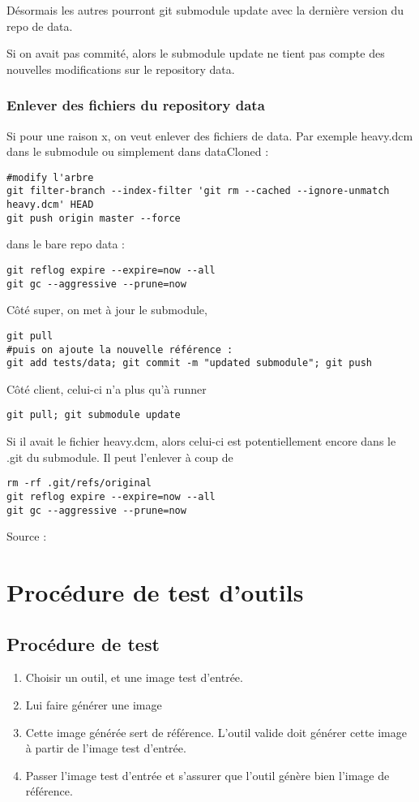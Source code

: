 \documentclass[12pt]{report}
\begin{document}
Désormais les autres pourront git submodule update avec la dernière version du repo de data.

Si on avait pas commité, alors le submodule update ne tient pas compte des nouvelles modifications
sur le repository data.

\subsection{Enlever des fichiers du repository data}
Si pour une raison x, on veut enlever des fichiers de data. Par exemple heavy.dcm
dans le submodule ou simplement dans dataCloned : 
\begin{verbatim}
#modify l'arbre
git filter-branch --index-filter 'git rm --cached --ignore-unmatch heavy.dcm' HEAD
git push origin master --force
\end{verbatim}

dans le bare repo data : 
\begin{verbatim}
git reflog expire --expire=now --all
git gc --aggressive --prune=now
\end{verbatim}

Côté super, on met à jour le submodule,
\begin{verbatim}
git pull 
#puis on ajoute la nouvelle référence : 
git add tests/data; git commit -m "updated submodule"; git push
\end{verbatim}


Côté client, celui-ci n'a plus qu'à runner 
\begin{verbatim}
git pull; git submodule update
\end{verbatim}
Si il avait le fichier heavy.dcm, alors celui-ci est potentiellement encore dans le .git du submodule. Il peut l'enlever
à coup de 
\begin{verbatim}
rm -rf .git/refs/original
git reflog expire --expire=now --all
git gc --aggressive --prune=now
\end{verbatim}

Source : 




 
 \chapter{Procédure de test d'outils}
\section{Procédure de test}
\begin{enumerate}
	\item Choisir un outil, et une image test d'entrée.
	\item Lui faire générer une image
	\item Cette image générée sert de référence. L'outil valide doit générer cette image à partir de l'image test d'entrée.
	\item Passer l'image test d'entrée et s'assurer que l'outil génère bien l'image de référence.
\end{enumerate}
\end{document}
